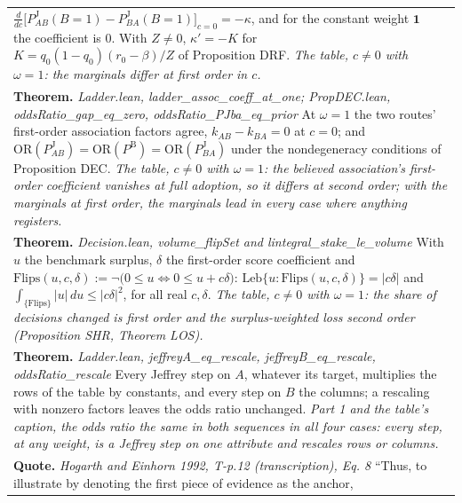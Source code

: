 \documentclass[10pt]{article}
\theoremstyle{definition}
\newcommand{\PB}{P^{\mathrm{B}}}
\newcommand{\PJ}{P^{\mathrm{J}}}
\newlength{\fullw}\setlength{\fullw}{25.9cm}
\begin{document}
{\begin{longtable}{|p{0.9cm}|p{12.2cm}|p{12.2cm}|}
{$\frac{d}{dc}\bigl[\PJ_{AB}(B{=}1)-\PJ_{BA}(B{=}1)\bigr]_{c=0}=-\kappa$, and for the
constant weight $\mathbf 1$ the coefficient is $0$. With $Z\neq0$,
$\kappa'=-K$ for $K=q_0(1-q_0)(r_0-\beta)/Z$ of Proposition DRF. \newline \textit{The table, $c\neq0$ with $\omega=1$: the marginals differ at first order in $c$.}} \\
\multicolumn{3}{|p{\fullw}|}{\textbf{Theorem.} \textit{Ladder.lean, ladder\_assoc\_coeff\_at\_one; PropDEC.lean, oddsRatio\_gap\_eq\_zero, oddsRatio\_PJba\_eq\_prior} \newline At $\omega=1$ the two routes' first-order association factors agree,
$k_{AB}-k_{BA}=0$ at $c=0$; and $\mathrm{OR}(\PJ_{AB})=\mathrm{OR}(\PB)=\mathrm{OR}(\PJ_{BA})$
under the nondegeneracy conditions of Proposition DEC. \newline \textit{The table, $c\neq0$ with $\omega=1$: the believed association's first-order coefficient vanishes at full adoption, so it differs at second order; with the marginals at first order, the marginals lead in every case where anything registers.}} \\
\multicolumn{3}{|p{\fullw}|}{\textbf{Theorem.} \textit{Decision.lean, volume\_flipSet and lintegral\_stake\_le\_volume} \newline With $u$ the benchmark surplus, $\delta$ the first-order score
coefficient and $\mathrm{Flips}(u,c,\delta) := \neg\big(0\le u \iff 0\le u + c\delta\big)$:
$\mathrm{Leb}\{u : \mathrm{Flips}(u,c,\delta)\} = |c\delta|$ and
$\int_{\{\mathrm{Flips}\}} |u|\,du \le |c\delta|^2$, for all real $c,\delta$. \newline \textit{The table, $c\neq0$ with $\omega=1$: the share of decisions changed is first order and the surplus-weighted loss second order (Proposition SHR, Theorem LOS).}} \\
\multicolumn{3}{|p{\fullw}|}{\textbf{Theorem.} \textit{Ladder.lean, jeffreyA\_eq\_rescale, jeffreyB\_eq\_rescale, oddsRatio\_rescale} \newline Every Jeffrey step on $A$, whatever its target, multiplies the rows of the table by
constants, and every step on $B$ the columns; a rescaling with nonzero factors leaves the
odds ratio unchanged. \newline \textit{Part 1 and the table's caption, the odds ratio the same in both sequences in all four cases: every step, at any weight, is a Jeffrey step on one attribute and rescales rows or columns.}} \\
\multicolumn{3}{|p{\fullw}|}{\textbf{Quote.} \textit{Hogarth and Einhorn 1992, T-p.12 (transcription), Eq. 8} \newline ``Thus, to illustrate by denoting the first piece of evidence as the anchor,
}
\end{longtable}}
\end{document}
